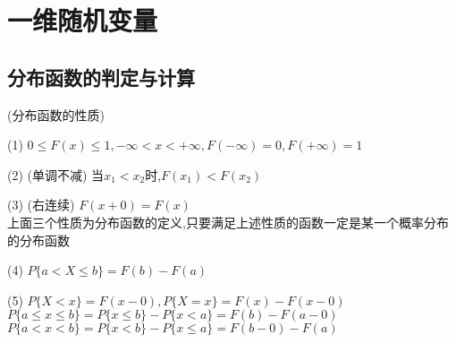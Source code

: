 \documentclass[12pt, a4paper, oneside, UTF8]{ctexbook}
\begin{document}
% 
\else
\fi

\chapter{一维随机变量}

\section{分布函数的判定与计算}
\begin{remark}
    (分布函数的性质)
    \item [(1)] $0\leq F(x)\leq 1, -\infty < x < +\infty, F(-\infty) = 0, F(+\infty)=1$ 
    \item [(2)] (单调不减) 当$x_1 < x_2$时,$F(x_1)<F(x_2)$ 
    \item [(3)] (右连续) $F(x+0)=F(x)$ \\
    上面三个性质为分布函数的定义,只要满足上述性质的函数一定是某一个概率分布的分布函数
    \item [(4)] $P\{a<X\leq b\}=F(b)-F(a)$
    \item [(5)] $P\{X<x\}=F(x-0), P\{X=x\}=F(x)-F(x-0)$ \\
    $P\{a\leq x\leq b\}=P\{x\leq b\}-P\{x<a\}=F(b)-F(a-0)$ \\
    $P\{a<x<b\}=P\{x<b\}-P\{x\leq a\}=F(b-0)-F(a)$
\end{remark}
\end{document}
